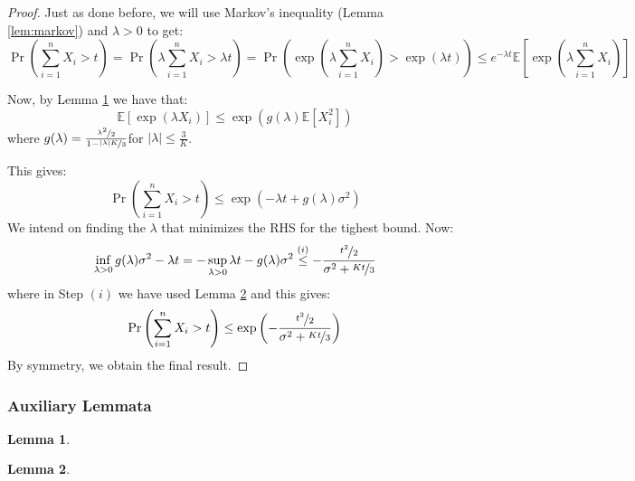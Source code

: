 \documentclass{article}
\newtheorem{lemma}{Lemma}[subsection]
\theoremstyle{remark}
\newcommand{\Exp}{\mathbb{E}}
\begin{document}
\begin{proof}
Just as done before, we will use Markov's inequality (Lemma \ref{lem:markov}) and \(\lambda > 0\) to get:
\begin{equation*}
\Pr\left(\sum_{i=1}^{n} X_{i} > t\right) = \Pr\left(\lambda \sum_{i=1}^{n} X_{i} > \lambda t \right) = \Pr\left(\exp\left(\lambda \sum_{i=1}^{n}X_{i}\right) > \exp(\lambda t)\right) \leq e^{-\lambda t} \Exp\left[\exp\left(\lambda \sum_{i=1}^{n} X_{i}\right)\right]
\end{equation*}

Now, by Lemma \ref{lem:bounded-rv-mgf-bound} we have that:
\begin{equation*}
\Exp\left[\exp(\lambda X_{i})\right] \leq \exp(g(\lambda) \Exp[X_{i}^{2}])
\end{equation*}
where \(g(\lambda) = \frac{\nicefrac{\lambda^{2}}{2}}{1 - \nicefrac{|\lambda|K}{3}}\)for \(|\lambda| \leq \frac{3}{K}\).

This gives:
\begin{equation*}
\Pr\left(\sum_{i=1}^{n} X_{i} > t\right) \leq \exp\left(-\lambda t + g(\lambda) \sigma^{2}\right)
\end{equation*}
We intend on finding the \(\lambda\) that minimizes the RHS for the tighest bound. Now:
\begin{equation*}
\inf_{\lambda > 0} g(\lambda) \sigma^{2} - \lambda t = -\sup_{\lambda > 0} \lambda t - g(\lambda) \sigma^{2} \overset{(i)}\leq -\frac{\nicefrac{t^{2}}{2}}{\sigma^{2} + \nicefrac{Kt}{3}}
\end{equation*}
where in Step \((i)\) we have used Lemma \ref{lem:special-func-bernstein-bound} and this gives:
\begin{equation*}
\Pr\left(\sum_{i=1}^{n} X_{i} > t\right) \leq \exp\left(-\frac{\nicefrac{t^{2}}{2}}{\sigma^{2} + \nicefrac{Kt}{3}}\right)
\end{equation*}
By symmetry, we obtain the final result.
\end{proof}

\subsubsection{Auxiliary Lemmata}
\begin{lemma}
\label{lem:bounded-rv-mgf-bound}
\end{lemma}

\begin{lemma}
\label{lem:special-func-bernstein-bound}
\end{lemma}

\newpage


\end{document}
